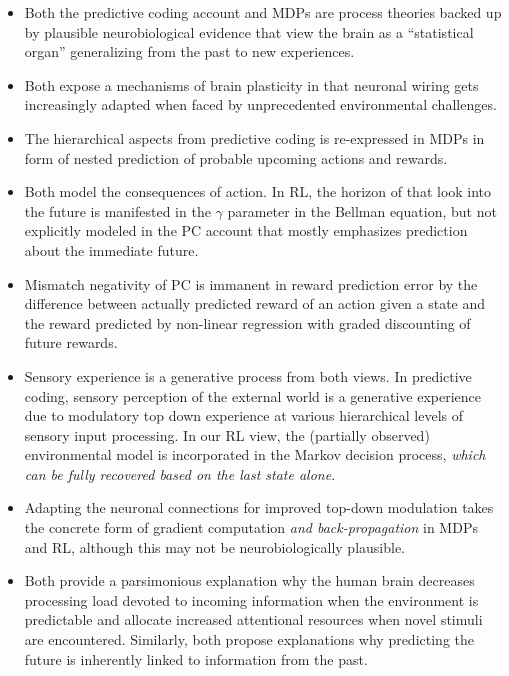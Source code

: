 \documentclass{article} %
\begin{document}
\begin{itemize}
  \item Both the predictive coding account and MDPs
  are process theories backed up by plausible
  neurobiological evidence that
  view the brain as a ``statistical organ''
  generalizing from the past to new experiences.
  \item Both expose a mechanisms of brain plasticity in that
  neuronal wiring gets increasingly adapted
  when faced by unprecedented environmental
  challenges.
  \item The hierarchical aspects from predictive coding
  is re-expressed in MDPs in form of
  nested prediction of probable upcoming actions and rewards.
  \item Both model the consequences of action. In RL, the horizon of that
  look into the future is manifested in the $\gamma$ parameter
  in the Bellman equation, but not
  explicitly modeled in the PC account that
  mostly emphasizes prediction about the
  immediate future.
  \item Mismatch negativity of PC is immanent in reward prediction error
  by the difference between actually predicted reward of an action given
  a state and the reward predicted by non-linear regression with graded
  discounting of future rewards.
  \item Sensory experience is a generative process from both views.
  In predictive coding, sensory perception of the external world
  is a generative experience due to modulatory top down experience at
  various hierarchical levels of sensory input processing.
  In our RL view, the (partially observed)
  environmental model is incorporated in the Markov decision
  process, \textit{which can be fully recovered based on the last
  state alone}.
  \item Adapting the neuronal connections for improved top-down modulation
  takes the concrete form of gradient computation
  \textit{and back-propagation} in MDPs and RL,
  although this may not be neurobiologically plausible.
  \item Both provide a parsimonious explanation why the
  human brain decreases processing load devoted to incoming information
  when the environment is predictable and allocate increased
  attentional resources when novel stimuli are encountered.
  Similarly, both propose explanations why
  predicting the future is inherently
  linked to information from the past.
\end{itemize}
\end{document}
